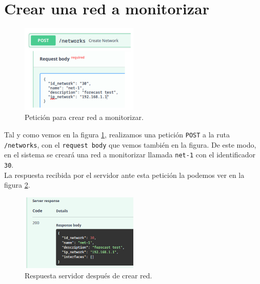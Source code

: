 \documentclass[a4paper, oneside, 12pt]{book}
\begin{document}
	\section{Crear una red a monitorizar}
	
	\begin{figure}[h!]
		\begin{center}
			\includegraphics[width=0.5\textwidth]{diag/request_create_net.png}
			\caption{Petición para crear red a monitorizar.}
			\label{img: request create net}
		\end{center}
	\end{figure}
	
	\pagebreak
	
	\noindent Tal y como vemos en la figura \ref{img: request create net}, realizamos una petición \texttt{POST} a la ruta \texttt{/networks}, con el \texttt{request body} que vemos también en la figura. De este modo, en el sistema se creará una red a monitorizar llamada \texttt{net-1} con el identificador \texttt{30}. \\
	
	\noindent La respuesta recibida por el servidor ante esta petición la podemos ver en la figura \ref{img: response create net (validate)}.
	
	\begin{figure}[h!]
		\begin{center}
			\includegraphics[width=0.5\textwidth]{img/response_create_net.png}
			\caption{Respuesta servidor después de crear red.}
			\label{img: response create net (validate)}
		\end{center}
	\end{figure}
\end{document}
